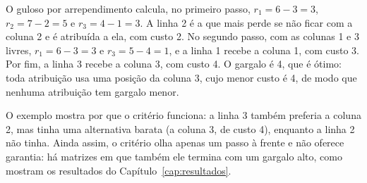 O guloso por arrependimento calcula, no primeiro passo, $r_1 = 6 - 3 = 3$, $r_2 = 7 - 2 = 5$ e $r_3 = 4 - 1 = 3$. A linha 2 é a que mais perde se não ficar com a coluna 2 e é atribuída a ela, com custo 2. No segundo passo, com as colunas 1 e 3 livres, $r_1 = 6 - 3 = 3$ e $r_3 = 5 - 4 = 1$, e a linha 1 recebe a coluna 1, com custo 3. Por fim, a linha 3 recebe a coluna 3, com custo 4. O gargalo é 4, que é ótimo: toda atribuição usa uma posição da coluna 3, cujo menor custo é 4, de modo que nenhuma atribuição tem gargalo menor.

O exemplo mostra por que o critério funciona: a linha 3 também preferia a coluna 2, mas tinha uma alternativa barata (a coluna 3, de custo 4), enquanto a linha 2 não tinha. Ainda assim, o critério olha apenas um passo à frente e não oferece garantia: há matrizes em que também ele termina com um gargalo alto, como mostram os resultados do Capítulo~\ref{cap:resultados}.




